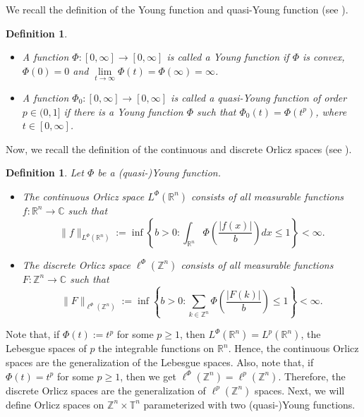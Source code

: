 \documentclass[a4paper,11pt, reqno]{amsart}
\theoremstyle{plain}
\newtheorem{Def}[theorem]{Definition}
\theoremstyle{definition}
\theoremstyle{remark}
\def \Z{{\mathbb Z}}
\def \T{{\mathbb T}}
\begin{document}
We recall the definition of the Young function and quasi-Young function (see \cite{gum24}).
\begin{Def}
\begin{itemize}
\item[(1)] A function $\Phi : [0, \infty] \rightarrow [0, \infty]$ is called a Young function if $\Phi$ is convex, $\Phi(0)=0$ and $\lim\limits_{t \rightarrow \infty} \Phi(t)=\Phi(\infty)=\infty$.

\item[(2)] A function $\Phi_0 : [0, \infty] \to [0, \infty]$ is called a quasi-Young function of order $p \in (0,1]$ if there is a Young function $\Phi$ such that $\Phi_0(t)=\Phi\left(t^{p}\right)$, where $t \in [0, \infty]$.
\end{itemize}
\end{Def}
Now, we recall the definition of the continuous and discrete Orlicz spaces (see \cite{gum24, mal00}).
\begin{Def}
Let $\Phi$ be a (quasi-)Young function.
\begin{itemize}
\item[(1)] The continuous Orlicz space $L^{\Phi} (\mathbb{R}^n)$ consists of all measurable functions $f: \mathbb{R}^n \rightarrow \mathbb{C}$ such that
$$ \|f\|_{L^{\Phi}\left(\mathbb{R}^n\right)}:=\inf \left\{b>0: \int_{\mathbb{R}^n} \Phi\left(\frac{|f(x)|}{b}\right) d x \leq 1\right\} <\infty .$$

\item[(2)] The discrete Orlicz space $\ell^{\Phi} (\mathbb{Z}^n)$ consists of all measurable functions $F: \mathbb{Z}^n \rightarrow \mathbb{C}$ such that  
$$ \|F\|_{\ell^{\Phi}\left(\mathbb{Z}^n\right)}:=\inf \left\{b>0: \sum_{k \in \mathbb{Z}^n} \Phi\left(\frac{\left|F(k)\right|}{b}\right) \leq 1\right\}<\infty .$$
\end{itemize}
\end{Def}

Note that, if $\Phi(t):=t^p$ for some $p \geq 1$, then $L^{\Phi} (\mathbb{R}^n)=L^p (\mathbb{R}^n)$, the Lebesgue spaces of $p$ the integrable functions on $\mathbb{R}^n$. Hence, the continuous Orlicz spaces are the generalization of the Lebesgue spaces. Also, note that, if $\Phi(t)=t^p$ for some $p \geq 1$, then we get $\ell^{\Phi}(\mathbb{Z}^n)=\ell^p (\mathbb{Z}^n)$. Therefore, the discrete Orlicz spaces are the generalization of $\ell^p (\mathbb{Z}^n)$ spaces. Next, we will define Orlicz spaces on $\Z^n \times \T^n$ parameterized with two (quasi-)Young functions. 
\end{document}
